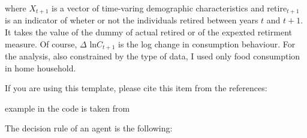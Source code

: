 \documentclass[11pt, a4paper, leqno]{article}
\begin{document}
where $X_{t+1}$ is a vector of time-varing demographic characteristics and retire$_{t+1}$ is an indicator of wheter or not the individuals retired between years $t$ and $t+1$. It takes the value of the dummy of actual retired or of the expexted retirment measure. Of course, $\Delta$ ln$C_{t+1}$ is the log change in consumption behaviour. For the analysis, also constrained by the type of data, I used only food consumption in home household.

If you are using this template, please cite this item from the references: \citet{GaudeckerEconProjectTemplates}

\citet{Schelling69} example in the code is taken from \citet{StachurskiSargent13}

The decision rule of an agent is the following:













\printbibliography
{}





\end{document}
